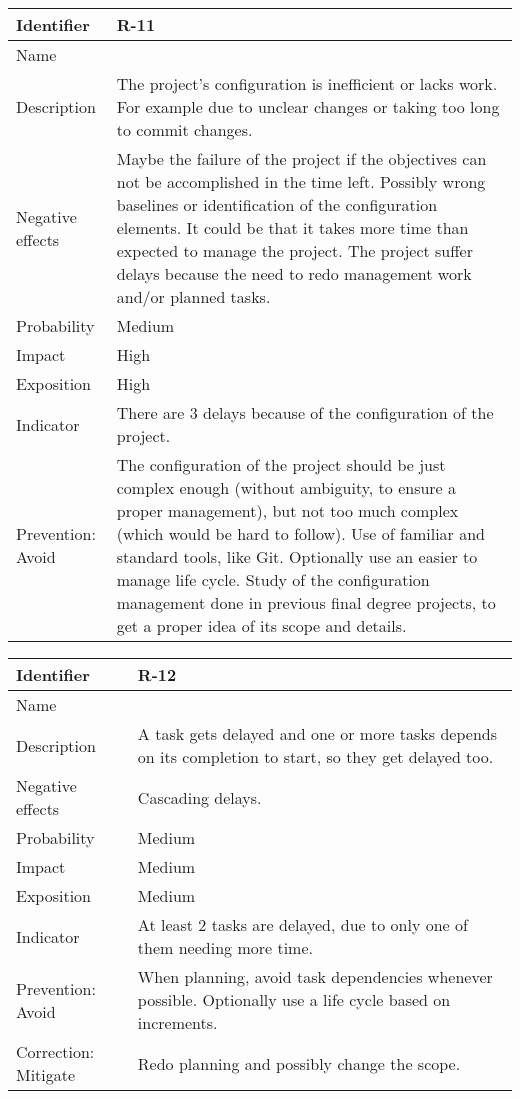 \begin{table}[H]
	\begin{tabularx}{\textwidth}{|y|z|}
		\hline
		Identifier & \textbf{R-11} \\ \hline
		Name & \Ronce \\ \hline
		Description &
			The project's configuration is inefficient or lacks work. \linej
			For example due to unclear changes or taking too long to commit changes.
		\\ \hline
		Negative effects &
			Maybe the failure of the project if the objectives can not be accomplished in the time left. \linej
			Possibly wrong baselines or identification of the configuration elements. \linej
			It could be that it takes more time than expected to manage the project. \linej
			The project suffer delays because the need to redo management work and/or planned tasks.
		\\ \hline
		Probability & Medium\\ \hline
		Impact &  High\\ \hline
		Exposition &  High\\ \hline
		Indicator & There are 3 delays because of the configuration of the project.\\ \hline
		Prevention: Avoid &
			The configuration of the project should be just complex enough (without ambiguity, to ensure a proper management), but not too much complex (which would be hard to follow). \linej
			Use of familiar and standard tools, like Git. \linej
			Optionally use an easier to manage life cycle. \linej
			Study of the configuration management done in previous final degree projects, to get a proper idea of its scope and details.
		\\ \hline
	\end{tabularx}
\end{table}

\begin{table}[H]
	\begin{tabularx}{\textwidth}{|y|z|}
		\hline
		Identifier & \textbf{R-12} \\ \hline
		Name & \Rdoce \\ \hline
		Description &
			A task gets delayed and one or more tasks depends on its completion to start, so they get delayed too.
		\\ \hline
		Negative effects &
			Cascading delays.
		\\ \hline
		Probability & Medium\\ \hline
		Impact &  Medium\\ \hline
		Exposition &  Medium\\ \hline
		Indicator & At least 2 tasks are delayed, due to only one of them needing more time.\\ \hline
		Prevention: Avoid &
			When planning, avoid task dependencies whenever possible. \linej
			Optionally use a life cycle based on increments.
		\\ \hline
		Correction: Mitigate &
			Redo planning and possibly change the scope.
		\\ \hline
	\end{tabularx}
\end{table}

